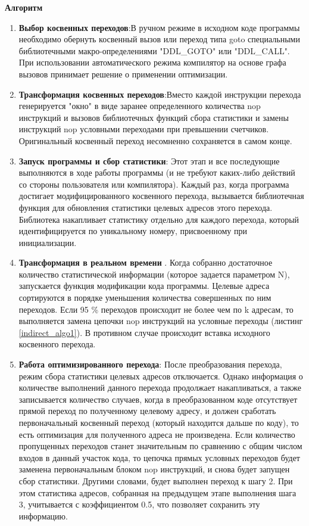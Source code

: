 \textbf{Алгоритм}
 \begin{enumerate}
 	\item \textbf{Выбор косвенных переходов}:В ручном режиме в исходном коде программы  необходимо обернуть косвенный вызов или переход типа goto специальными библиотечными макро-определениями "DDL\_GOTO" или "DDL\_CALL". При использовании автоматического режима компилятор на основе графа вызовов принимает решение о применении оптимизации. 
 	\item \textbf{Трансформация косвенных переходов}:Вместо каждой инструкции перехода генерируется "окно" в виде заранее определенного количества nop инструкций и вызовов библиотечных функций сбора статистики и замены инструкций nop условными переходами при превышении счетчиков. Оригинальный косвенный переход несомненно сохраняется в самом конце.
 	\item \textbf{Запуск программы и сбор статистики}: Этот этап и все последующие  выполняются в ходе работы программы (и не требуют каких-либо действий со стороны пользователя или компилятора). Каждый раз, когда программа достигает модифицированного косвенного перехода, вызывается библиотечная функция для обновления статистики целевых адресов этого перехода. Библиотека  накапливает статистику отдельно для каждого перехода, который идентифицируется по уникальному номеру, присвоенному при инициализации.
 	\item \textbf{Трансформация в реальном времени} . Когда собранно достаточное количество статистической информации (которое задается параметром N), запускается функция модификации кода программы. Целевые адреса сортируются в порядке уменьшения количества совершенных по ним переходов. Если 95 \% переходов происходит не более чем по k адресам, то выполняется замена цепочки nop инструкций на условные переходы (листинг \ref{indirect_algo1}). В противном случае происходит вставка исходного косвенного перехода.
	\item \textbf{Работа оптимизированного перехода}: После преобразования перехода, режим сбора статистики целевых адресов отключается. Однако информация о количестве выполнений данного перехода продолжает накапливаться, а также записывается количество случаев, когда в преобразованном коде отсутствует прямой переход по полученному целевому адресу, и должен сработать первоначальный косвенный переход (который находится дальше по коду), то есть оптимизация для полученного адреса не произведена. Если количество пропущенных переходов станет значительным по сравнению с общим числом входов в данный участок кода, то цепочка прямых условных переходов будет заменена первоначальным блоком nop инструкций, и снова будет запущен сбор статистики. Другими словами, будет выполнен переход к шагу 2. При этом статистика адресов, собранная на предыдущем этапе выполнения шага 3, учитывается с коэффициентом 0.5, что позволяет сохранить эту информацию.
 \end{enumerate}

